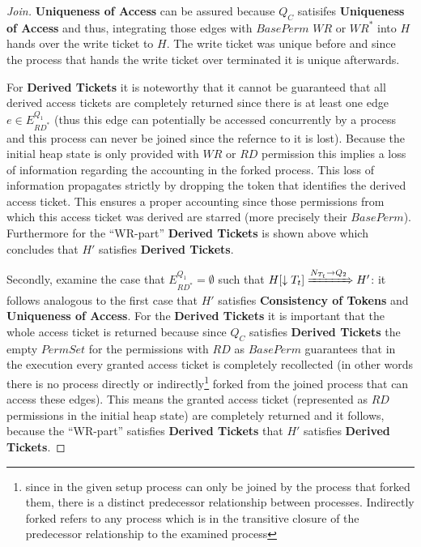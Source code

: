 \begin{proof}[Join]
		\textbf{Uniqueness of Access} can be assured because $Q_{C}$ satisifes
		\textbf{Uniqueness of Access} and thus, integrating those edges with
		$\mathit{BasePerm}$ $\mathit{WR}$ or $\mathit{WR}^{\ast}$ into $H$ hands
		over the write ticket to $H$. The write ticket was unique before and
		since the process that hands the write ticket over terminated it is
		unique afterwards.

		For \textbf{Derived Tickets} it is noteworthy that it cannot be
		guaranteed that all derived access tickets are completely returned since
		there is at least one edge $e\in E^{Q_{1}}_{\mathit{RD^{\ast}}}$ (thus
		this edge can potentially be accessed concurrently by a process and this
		process can never be joined since the refernce to it is lost). Because
		the initial heap state is only provided with $\mathit{WR}$ or
		$\mathit{RD}$ permission this implies a loss of information regarding the
		accounting in the forked process.
		This loss of information propagates strictly by dropping the token that
		identifies the derived access ticket. This ensures a proper accounting
		since those permissions from which this access ticket was derived are
		starred (more precisely their $\mathit{BasePerm}$). Furthermore for the
		\enquote{WR-part} \textbf{Derived Tickets} is shown above which concludes
		that $H'$ satisfies \textbf{Derived Tickets}.

		Secondly, examine the case that
		$E^{Q_{1}}_{\mathit{RD}^{\ast}}=\emptyset$ such that
		$H[\downarrow T_{t}]\xRightarrow{N_{T_{t}}\rightarrow Q_{2}}H'$:
		it follows analogous to the first case that $H'$ satisfies
		\textbf{Consistency of Tokens} and \textbf{Uniqueness of Access}. For
		the \textbf{Derived Tickets} it is important that the whole access ticket
		is returned because since $Q_{C}$ satisfies \textbf{Derived Tickets} the
		empty $\mathit{PermSet}$ for the permissions with $\mathit{RD}$ as
		$\mathit{BasePerm}$ guarantees that in the execution every granted access
		ticket is completely recollected (in other words there is no process
		directly or indirectly\footnote{since in the given setup process
		can only be joined by the process that forked them, there is a distinct
		predecessor relationship between processes. Indirectly forked refers to
		any process which is in the transitive closure of the predecessor
		relationship to the examined process}
		forked from the joined process that can access these edges). 
		This means the granted access ticket (represented as
		$\mathit{RD}$ permissions in the initial heap state) are completely
		returned and it follows, because the \enquote{WR-part} satisfies
		\textbf{Derived Tickets} that $H'$ satisfies \textbf{Derived Tickets}.
	\end{proof}

